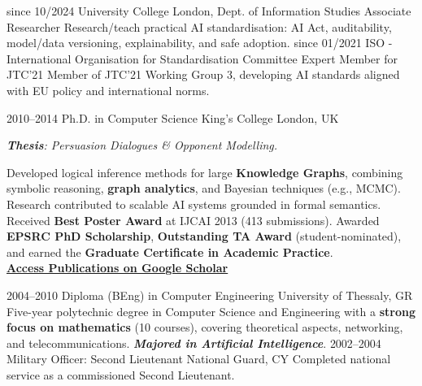 \documentclass[]{../../friggeri-cv}
\begin{document}
\begin{entrylist2}
    \entrytwo
        {\footnotesize since 10/2024}
        {\small University College London, Dept. of Information Studies}
        {\small Associate Researcher}
        {\small Research/teach practical AI standardisation: AI Act, auditability, model/data versioning, explainability, and safe adoption.}
    \entrytwo
        {\footnotesize since 01/2021}
        {\small ISO - International Organisation for Standardisation}
        {\small Committee Expert Member for JTC'21}
        {\footnotesize Member of JTC'21 Working Group 3, developing AI standards aligned with EU policy and international norms.}
\end{entrylist2}
\begin{entrylist2}
    \entrytwo
        {\small 2010--2014}
        {\small Ph.D. in Computer Science}
        {\small King's College London, UK}
        {\small \emph{\textbf{Thesis}: Persuasion Dialogues \& Opponent Modelling.}

        {\footnotesize Developed logical inference methods for large \textbf{Knowledge Graphs}, combining symbolic reasoning, \textbf{graph analytics}, and Bayesian techniques (e.g., MCMC). Research contributed to scalable AI systems grounded in formal semantics. Received \textbf{Best Poster Award} at IJCAI 2013 (413 submissions). Awarded \textbf{EPSRC PhD Scholarship}, \textbf{Outstanding TA Award} (student-nominated), and earned the \textbf{Graduate Certificate in Academic Practice}.
        \\ \textbf{\textcolor{blue}{\href{https://scholar.google.com/citations?hl=en&user=Rr3KTx8AAAAJ}{\underline{Access Publications on Google Scholar}}}}}
        }
    \entrytwo
        {\small  2004--2010}
        {\small Diploma (BEng) in Computer Engineering}
        {\small University of Thessaly, GR}
        {\footnotesize Five-year polytechnic degree in Computer Science and Engineering with a \textbf{strong focus on mathematics} (10 courses), covering theoretical aspects, networking, and telecommunications. \emph{\textbf{Majored in Artificial Intelligence}}.}
    \entrytwo
        {\small  2002--2004}
        {\small Military Officer: Second Lieutenant}
        {\small National Guard, CY}
        {\small Completed national service as a commissioned Second Lieutenant.}
\end{entrylist2}
\end{document}
